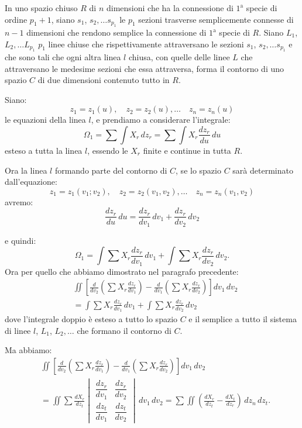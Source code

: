 \documentclass{article}
\begin{document}
In uno spazio chiuso $R$ di $n$ dimensioni che ha la connessione di $1^{\text{a}}$ specie di ordine $p_{1}+1$, siano $s_{1}$, $s_{2},\ldots s_{p_{1}}$ le $p_{1}$ sezioni trasverse semplicemente connesse di $n-1$ dimensioni che rendono semplice la connessione di $1^{\text{a}}$ specie di $R$. Siano $L_{1}$, $L_{2},\ldots L_{p_{1}}$ $p_{1}$ linee chiuse che rispettivamente attraversano le sezioni $s_{1}$, $s_{2},\ldots s_{p_{1}}$ e che sono tali che ogni altra linea $l$ chiusa, con quelle delle linee $L$ che attraversano le medesime sezioni che essa attraversa, forma il contorno di uno spazio $C$ di due dimensioni contenuto tutto in $R$.

Siano:
\[ z_{1} = z_{1}(u), \quad z_{2} = z_{2}(u),\ldots \quad z_{n} = z_{n}(u) \tag{1} \]
le equazioni della linea $l$, e prendiamo a considerare l'integrale:
\[ \Omega_{1} = \sum \int X_{r}\,dz_{r} = \sum \int X_{r} \frac{dz_{r}}{du}\,du \]
esteso a tutta la linea $l$, essendo le $X_{r}$ finite e continue in tutta $R$.

Ora la linea $l$ formando parte del contorno di $C$, se lo spazio $C$ sarà determinato dall'equazione:
\[ z_{1} = z_{1}(v_{1}; v_{2}), \quad z_{2} = z_{2}(v_{1}, v_{2}),\ldots \quad z_{n} = z_{n}(v_{1}, v_{2}) \]
avremo:
\[ \frac{dz_{r}}{du}\,du = \frac{dz_{r}}{dv_{1}}\,dv_{1} + \frac{dz_{r}}{dv_{2}}\,dv_{2} \]

e quindi:
\[ \Omega_{1} = \int \sum X_{r} \frac{dz_{r}}{dv_{1}}\,dv_{1} + \int \sum X_{r} \frac{dz_{r}}{dv_{2}}\,dv_{2}. \]
Ora per quello che abbiamo dimostrato nel paragrafo precedente:
\[ \begin{aligned} & \iint \left[ \frac{d}{dv_{2}} \left( \sum X_{r} \frac{dz_{r}}{dv_{1}} \right) - \frac{d}{dv_{1}} \left( \sum X_{r} \frac{dz_{r}}{dv_{2}} \right) \right] dv_{1}\,dv_{2} \\ &= \int \sum X_{r} \frac{dz_{r}}{dv_{1}}\,dv_{1} + \int \sum X_{r} \frac{dz_{r}}{dv_{2}}\,dv_{2} \end{aligned} \]
dove l'integrale doppio è esteso a tutto lo spazio $C$ e il semplice a tutto il sistema di linee $l$, $L_{1}$, $L_{2},\ldots$ che formano il contorno di $C$.

Ma abbiamo:
\[ \begin{aligned} & \iint \left[ \frac{d}{dv_{2}} \left( \sum X_{r} \frac{dz_{r}}{dv_{1}} \right) - \frac{d}{dv_{1}} \left( \sum X_{r} \frac{dz_{r}}{dv_{2}} \right) \right] dv_{1}\,dv_{2} \\ &= \iint \sum \frac{dX_{r}}{dz_{t}} \begin{vmatrix} \dfrac{dz_{r}}{dv_{1}} & \dfrac{dz_{r}}{dv_{2}} \\ \dfrac{dz_{t}}{dv_{1}} & \dfrac{dz_{t}}{dv_{2}} \end{vmatrix}\,dv_{1}\,dv_{2} = \sum \iint \left( \frac{dX_{r}}{dz_{t}} - \frac{dX_{t}}{dz_{r}} \right)\,dz_{n}\,dz_{t}. \end{aligned} \]
\end{document}
